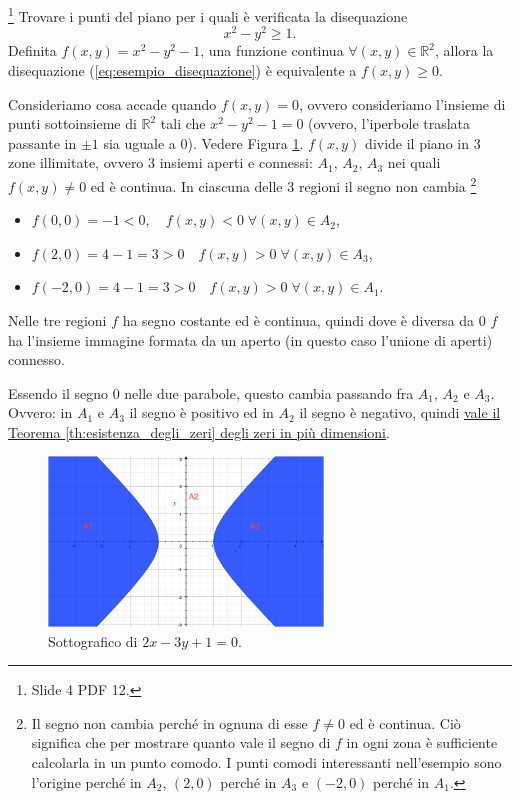 \begin{example}\footnote{Slide 4 PDF 12.}
    Trovare i punti del piano per i quali  è verificata la disequazione
    \begin{equation}\label{eq:esempio_disequazione}
        x^2-y^2\geq 1.
    \end{equation}
    Definita $f(x,y)=x^2-y^2-1$, una funzione continua $\forall(x,y)\in\mathbb R^2$, allora la disequazione (\ref{eq:esempio_disequazione}) è equivalente a $f(x,y)\geq 0$.
    
    Consideriamo cosa accade quando $f(x,y)=0$, ovvero consideriamo l'insieme di punti sottoinsieme di $\mathbb R^2$ tali che $x^2-y^2-1=0$ (ovvero, l'iperbole traslata passante in $\pm 1$ sia uguale a 0).
    Vedere Figura \ref{fig:grafico_x^2-y^2-1}. $f(x,y)$ divide il piano in 3 zone illimitate, ovvero 3 insiemi aperti e connessi: $A_1,\, A_2,\, A_3$ nei quali $f(x,y)\neq 0$ ed è continua. In ciascuna delle 3 regioni il segno non cambia \footnote{Il segno non cambia perché in ognuna di esse $f\neq 0$ ed è continua. Ciò significa che per mostrare quanto vale il segno di $f$ in ogni zona è sufficiente calcolarla in un punto comodo. I punti comodi interessanti nell'esempio sono l'origine perché in $A_2$, $(2,0)$ perché in $A_3$ e $(-2,0)$ perché in $A_1$.}
    \begin{itemize}
        \item $f(0,0)=-1<0,\quad f(x,y)<0\;\forall (x,y)\in A_2$,
        \item $f(2,0)=4-1=3>0\quad f(x,y)>0\; \forall (x,y)\in A_3$,
        \item $f(-2,0)=4-1=3>0\quad f(x,y)>0\; \forall (x,y)\in A_1$.
    \end{itemize}
    
    Nelle tre regioni $f$ ha segno costante ed è continua, quindi dove è diversa da 0 $f$ ha l'insieme immagine formata da un aperto (in questo caso l'unione di aperti) connesso.

    Essendo il segno 0 nelle due parabole, questo cambia passando fra $A_1,\, A_2$ e $A_3$. Ovvero: in $A_1$ e $A_3$ il segno è positivo ed in $A_2$ il segno è negativo, quindi \uline{vale il Teorema \ref{th:esistenza_degli_zeri} degli zeri in più dimensioni}.
    
    \begin{figure}
    \centering
    \includegraphics[width=0.65\textwidth]{Analisi2/figures/grafico_x^2-y^2-1.jpg}
        \caption{Sottografico di $2x-3y+1=0$.}\label{fig:grafico_x^2-y^2-1}
    \end{figure}
\end{example}

